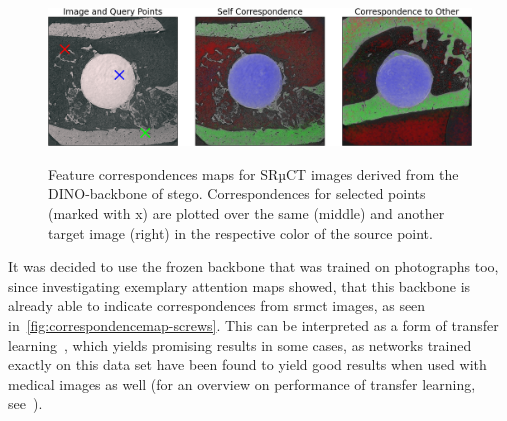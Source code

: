 \begin{figure}[!htb]
    \centering
    \vspace{1em}
    \includegraphics[width=\textwidth]{pictures/correspondencemaps_syn030-slice300_113724Mg10-slice500}\\
    \caption[Feature Correspondence for SRµCT Images]{Feature correspondences maps for SRµCT images derived from the DINO-backbone of \gls{stego}. Correspondences for selected points (marked with x) are plotted over the same (middle) and another target image (right) in the respective color of the source point.}
    \label{fig:correspondencemap-screws}
\end{figure}

It was decided to use the frozen backbone that was trained on photographs too, since investigating exemplary attention maps showed, that this backbone is already able to indicate correspondences from \gls{srmct} images, as seen in~\autoref{fig:correspondencemap-screws}.
This can be interpreted as a form of transfer learning~\autocite{Litjens2017}, which yields promising results in some cases, as networks trained exactly on this data set have been found to yield good results when used with medical images as well (for an overview on performance of transfer learning, see~\autocite{Cheplygina2019}).










